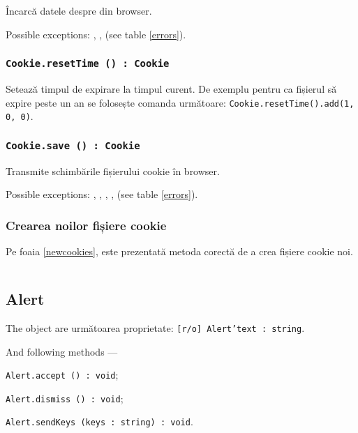 Încarcă datele despre \cookie{} din browser.

Possible exceptions: , ,  (see table \ref{errors}).

\subsubsection{\texttt{Cookie.resetTime () : Cookie}}

Setează timpul de expirare la timpul curent. De exemplu pentru ca fișierul să expire peste un an se folosește comanda următoare: \texttt{Cookie.resetTime().add(1, 0, 0)}.

\subsubsection{\texttt{Cookie.save () : Cookie}}

Transmite schimbările fișierului cookie în browser.

Possible exceptions: , , , ,  (see table \ref{errors}).

\subsubsection{Crearea noilor fișiere cookie}

Pe foaia \ref{newcookies}, este prezentată metoda corectă de a crea fișiere cookie noi.

\begin{sourcecode}
    \label{newcookies}
    \inputminted[linenos]{icl}{../sources/newcookies.icL}
\end{sourcecode}


\subsection{{\color{orange} Alert}}

The object \alert{} are următoarea proprietate: \texttt{[r/o] Alert'text : string}.

And following methods —
\begin{icItems}
	\item \texttt{Alert.accept () : void};
	\item \texttt{Alert.dismiss () : void};
	\item \texttt{Alert.sendKeys (keys : string) : void}.
\end{icItems}

